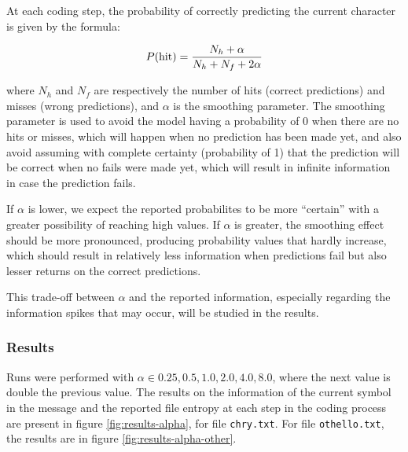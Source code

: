 \documentclass{article}
\begin{document}
At each coding step, the probability of correctly predicting the current character is given by the formula:

$$
P(\textnormal{hit}) = \frac{N_h + \alpha}{N_h + N_f + 2\alpha}
$$

where $N_h$ and $N_f$ are respectively the number of hits (correct predictions) and misses (wrong predictions), and $\alpha$ is the smoothing parameter.
The smoothing parameter is used to avoid the model having a probability of 0 when there are no hits or misses, which will happen when no prediction has been made yet, and also avoid assuming with complete certainty (probability of 1) that the prediction will be correct when no fails were made yet, which will result in infinite information in case the prediction fails.

If $\alpha$ is lower, we expect the reported probabilites to be more ``certain'' with a greater possibility of reaching high values.
If $\alpha$ is greater, the smoothing effect should be more pronounced, producing probability values that hardly increase, which should result in relatively less information when predictions fail but also lesser returns on the correct predictions.

This trade-off between $\alpha$ and the reported information, especially regarding the information spikes that may occur, will be studied in the results.

\subsubsection{Results}

Runs were performed with $\alpha \in {0.25, 0.5, 1.0, 2.0, 4.0, 8.0}$, where the next value is double the previous value.
The results on the information of the current symbol in the message and the reported file entropy at each step in the coding process are
present in figure \ref{fig:results-alpha}, for file \verb|chry.txt|.
For file \verb|othello.txt|, the results are in figure \ref{fig:results-alpha-other}.
\end{document}
